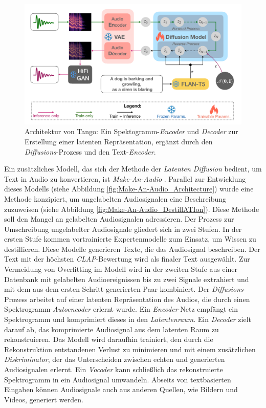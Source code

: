 \documentclass[
  a4paper,  %
  twoside,  %
  bibliography=totoc,
  headsepline,
  cleardoublepage=empty,
  parskip=half,
  draft=false
]{scrbook}
\begin{document}
\begin{figure}[h]
  \centering
  \includegraphics[width=.7\textwidth]{graphics/Tango.png}
  \caption[Tango Architektur]{Architektur von Tango: Ein Spektogramm-\emph{Encoder} und \emph{Decoder} zur Erstellung einer latenten Repräsentation, ergänzt durch den \emph{Diffusions}-Prozess und den Text-\emph{Encoder}. \cite{liu_roberta_2019}}
  \label{fig:tango}
\end{figure}

Ein zusätzliches Modell, das sich der Methode der \emph{Latenten Diffusion} \cite{rombach_high-resolution_2022} bedient, um Text in Audio zu konvertieren, ist \emph{Make-An-Audio} \cite{huang_make--audio_2023}. Parallel zur Entwicklung dieses Modells (siehe Abbildung \ref{fig:Make-An-Audio_Architecture}) wurde eine Methode konzipiert, um ungelabelten Audiosignalen eine Beschreibung zuzuweisen (siehe Abbildung \ref{fig:Make-An-Audio_DestillATIon}). Diese Methode soll den Mangel an gelabelten Audiosignalen adressieren. Der Prozess zur Umschreibung ungelabelter Audiosignale gliedert sich in zwei Stufen. In der ersten Stufe kommen vortrainierte Expertenmodelle \cite{xu_crnn-gru_2020, deshmukh_audio_2022, koepke_audio_2023} zum Einsatz, um Wissen zu destillieren. Diese Modelle generieren Texte, die das Audiosignal beschreiben. Der Text mit der höchsten \emph{CLAP}-Bewertung \cite{elizalde_clap_2022} wird als finaler Text ausgewählt. Zur Vermeidung von Overfitting im Modell wird in der zweiten Stufe aus einer Datenbank mit gelabelten Audioereignissen bis zu zwei Signale extrahiert und mit dem aus dem ersten Schritt generierten Paar kombiniert. Der \emph{Diffusions}-Prozess arbeitet auf einer latenten Repräsentation des Audios, die durch einen Spektrogramm-\emph{Autoencoder} erlernt wurde. Ein \emph{Encoder}-Netz empfängt ein Spektrogramm und komprimiert dieses in den \emph{Latentenraum}. Ein \emph{Decoder} zielt darauf ab, das komprimierte Audiosignal aus dem latenten Raum zu rekonstruieren. Das Modell wird daraufhin trainiert, den durch die Rekonstruktion entstandenen Verlust zu minimieren und mit einem zusätzlichen \emph{Diskriminator}, der das Unterscheiden zwischen echten und generierten Audiosignalen erlernt. Ein \emph{Vocoder} kann schließlich das rekonstruierte Spektrogramm in ein Audiosignal umwandeln. Abseits von textbasierten Eingaben können Audiosignale auch aus anderen Quellen, wie Bildern und Videos, generiert werden. \cite{huang_make--audio_2023}
 
\end{document}
